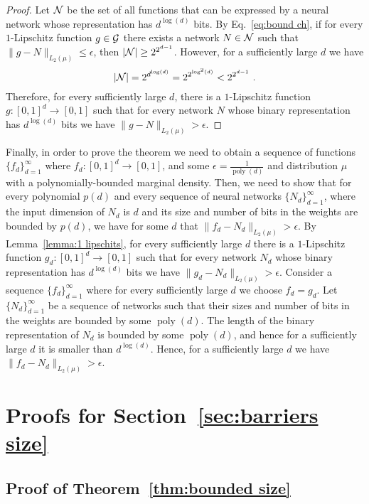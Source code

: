 \documentclass[11pt]{article}
\newcommand{\cg}{{\cal G}}
\newcommand{\cn}{{\cal N}}
\DeclareMathOperator{\poly}{poly}
\newcommand{\snorm}[1]{\|#1\|} %
\begin{document}
\begin{proof}
	Let $\cn$ be the set of all functions that can be expressed by a neural network whose representation has $d^{\log(d)}$ bits. By Eq.~\ref{eq:bound ch}, if for every $1$-Lipschitz function $g \in \cg$ there exists a network $N \in \cn$ such that $\snorm{g-N}_{L_2(\mu)} \leq \epsilon$, then $|\cn| \geq 2^{ 2^{d-1} }$. 
	However, for a sufficiently large $d$ we have 
	\[
		|\cn| = 2^{d^{\log(d)}} = 2^{2^{\log^2(d)}} < 2^{ 2^{d-1} }~.
	\] 
	Therefore, for every sufficiently large $d$, there is a $1$-Lipschitz function $g:[0,1]^d \rightarrow [0,1]$ such that for every network $N$ whose binary representation has $d^{\log(d)}$ bits we have $\snorm{g-N}_{L_2(\mu)} > \epsilon$.
\end{proof}

Finally, in order to prove the theorem we need to obtain a sequence of functions $\{f_d\}_{d=1}^\infty$ where $f_d:[0,1]^d \rightarrow [0,1]$, and some $\epsilon=\frac{1}{\poly(d)}$ and distribution $\mu$ with a polynomially-bounded marginal density. Then, we need to show that for every polynomial $p(d)$ and every sequence of neural networks $\{N_d\}_{d=1}^\infty$, where the input dimension of $N_d$ is $d$ and its size and number of bits in the weights are bounded by $p(d)$, we have for some $d$ that $\snorm{f_d - N_d}_{L_2(\mu)} > \epsilon$. By Lemma~\ref{lemma:1 lipschits}, for every sufficiently large $d$ there is a $1$-Lipschitz function $g_d:[0,1]^d \rightarrow [0,1]$ such that for every network $N_d$ whose binary representation has $d^{\log(d)}$ bits we have $\snorm{g_d-N_d}_{L_2(\mu)} > \epsilon$. Consider a sequence $\{f_d\}_{d=1}^\infty$ where for every sufficiently large $d$ we choose $f_d=g_d$. Let $\{N_d\}_{d=1}^\infty$ be a sequence of networks such that their sizes and number of bits in the weights are bounded by some $\poly(d)$. The length of the binary representation of $N_d$ is bounded by some $\poly(d)$, and hence for a sufficiently large $d$ it is smaller than $d^{\log(d)}$. Hence, for a sufficiently large $d$ we have $\snorm{f_d-N_d}_{L_2(\mu)} > \epsilon$.

\section{Proofs for Section~\ref{sec:barriers size}}

\subsection{Proof of Theorem~\ref{thm:bounded size}}
\label{app:proof of theorem bounded size}
\end{document}
